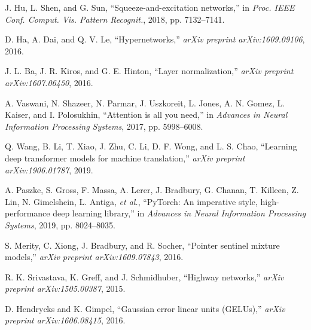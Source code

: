 \documentclass[lettersize,journal]{IEEEtran}
\begin{document}
\begin{thebibliography}{1}
J. Hu, L. Shen, and G. Sun, ``Squeeze-and-excitation networks,'' in \textit{Proc. IEEE Conf. Comput. Vis. Pattern Recognit.}, 2018, pp. 7132--7141.

D. Ha, A. Dai, and Q. V. Le, ``Hypernetworks,'' \textit{arXiv preprint arXiv:1609.09106}, 2016.

J. L. Ba, J. R. Kiros, and G. E. Hinton, ``Layer normalization,'' \textit{arXiv preprint arXiv:1607.06450}, 2016.

A. Vaswani, N. Shazeer, N. Parmar, J. Uszkoreit, L. Jones, A. N. Gomez, L. Kaiser, and I. Polosukhin, ``Attention is all you need,'' in \textit{Advances in Neural Information Processing Systems}, 2017, pp. 5998--6008.

Q. Wang, B. Li, T. Xiao, J. Zhu, C. Li, D. F. Wong, and L. S. Chao, ``Learning deep transformer models for machine translation,'' \textit{arXiv preprint arXiv:1906.01787}, 2019.

A. Paszke, S. Gross, F. Massa, A. Lerer, J. Bradbury, G. Chanan, T. Killeen, Z. Lin, N. Gimelshein, L. Antiga, \textit{et al.}, ``PyTorch: An imperative style, high-performance deep learning library,'' in \textit{Advances in Neural Information Processing Systems}, 2019, pp. 8024--8035.

S. Merity, C. Xiong, J. Bradbury, and R. Socher, ``Pointer sentinel mixture models,'' \textit{arXiv preprint arXiv:1609.07843}, 2016.

R. K. Srivastava, K. Greff, and J. Schmidhuber, ``Highway networks,'' \textit{arXiv preprint arXiv:1505.00387}, 2015.

D. Hendrycks and K. Gimpel, ``Gaussian error linear units (GELUs),'' \textit{arXiv preprint arXiv:1606.08415}, 2016.

\end{thebibliography}
\end{document}
